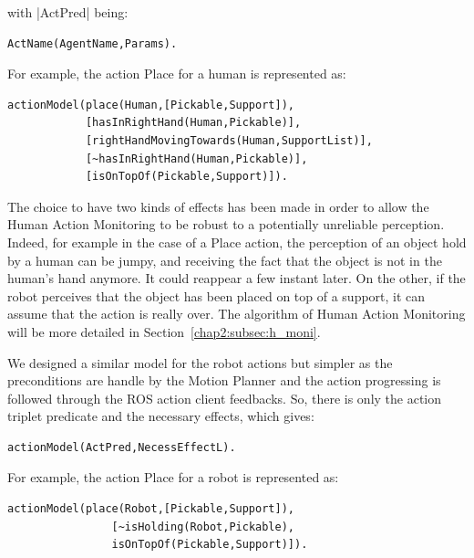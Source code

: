 \documentclass[a4paper,11pt,twoside]{StyleThese}
\begin{document}
\noindent
with |ActPred| being:
\begin{lstlisting}[style=aslDef]
			ActName(AgentName,Params).
\end{lstlisting}

For example, the action Place for a human is represented as:
\begin{lstlisting}[style=aslDef]
actionModel(place(Human,[Pickable,Support]),
			[hasInRightHand(Human,Pickable)],
			[rightHandMovingTowards(Human,SupportList)],
			[~hasInRightHand(Human,Pickable)],
			[isOnTopOf(Pickable,Support)]).
\end{lstlisting}

The choice to have two kinds of effects has been made in order to allow the Human Action Monitoring to be robust to a potentially unreliable perception. Indeed, for example in the case of a Place action, the perception of an object hold by a human can be jumpy, and receiving the fact that the object is not in the human's hand anymore. It could reappear a few instant later. On the other, if the robot perceives that the object has been placed on top of a support, it can assume that the action is really over. The algorithm of Human Action Monitoring will be more detailed in Section~\ref{chap2:subsec:h_moni}.

We designed a similar model for the robot actions but simpler as the preconditions are handle by the Motion Planner and the action progressing is followed through the ROS action client feedbacks. So, there is only the action triplet predicate and the necessary effects, which gives:
\begin{lstlisting}[style=aslDef]
			actionModel(ActPred,NecessEffectL).
\end{lstlisting}

For example, the action Place for a robot is represented as:
\begin{lstlisting}[style=aslDef]
actionModel(place(Robot,[Pickable,Support]),
				[~isHolding(Robot,Pickable), 
				isOnTopOf(Pickable,Support)]).
\end{lstlisting}
\end{document}
